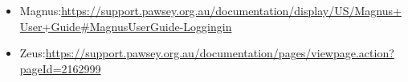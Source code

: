 \documentclass[journal,a4paper,pdftex]{IEEEtran}
\begin{document}
\begin{itemize}
\item Magnus:\url{https://support.pawsey.org.au/documentation/display/US/Magnus+User+Guide\#MagnusUserGuide-Loggingin} 
\item Zeus:\url{https://support.pawsey.org.au/documentation/pages/viewpage.action?pageId=2162999}  
\end{itemize}





%





\end{document}
